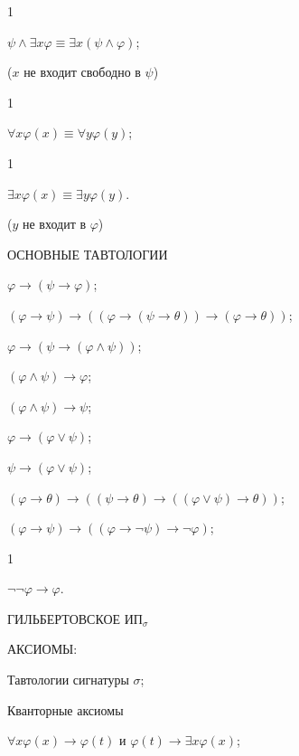 \documentclass[a4paper,11pt]{article}
\begin{document}
1\item $\psi \land\exists x \varphi \equiv\exists x (\psi \land \varphi)$;

($x$  не входит свободно в $\psi$)

1\item $\forall x \varphi(x) \equiv\forall y \varphi(y)$; 

1\item $\exists
x\varphi(x) \equiv \exists y\varphi(y)$.

($y$ не входит в $\varphi$)

\pagebreak

ОСНОВНЫЕ ТАВТОЛОГИИ
\medskip

\item $\varphi\rightarrow(\psi\rightarrow\varphi)$; 

\item $(\varphi\rightarrow\psi) \rightarrow ((\varphi\rightarrow (\psi
\rightarrow \theta))\rightarrow
(\varphi \rightarrow\theta))$;
\medskip

\item $\varphi \rightarrow (\psi\rightarrow (\varphi \land \psi))$;

\item $(\varphi
\land \psi)\rightarrow \varphi$;

\item $(\varphi \land \psi) \rightarrow\psi$; 
\medskip

\item $\varphi
\rightarrow
(\varphi \lor \psi)$;

\item $\psi \rightarrow (\varphi \lor \psi)$;

\item $(\varphi
\rightarrow \theta) \rightarrow ((\psi \rightarrow \theta)
\rightarrow ((\varphi \lor \psi) \rightarrow
\theta))$;
\medskip

\item $(\varphi \rightarrow \psi) \rightarrow ((\varphi \rightarrow
\neg\psi) \rightarrow \neg\varphi)$; 

1\item $\neg\neg\varphi\rightarrow \varphi$.
\pagebreak


ГИЛЬБЕРТОВСКОЕ  ИП$_\sigma$

АКСИОМЫ: 

Тавтологии сигнатуры $\sigma$; 
\medskip

Кванторные аксиомы 

$\forall x \varphi(x)\rightarrow
\varphi(t)$ и $\varphi(t)\rightarrow \exists x \varphi(x)$;
\medskip
\end{document}
